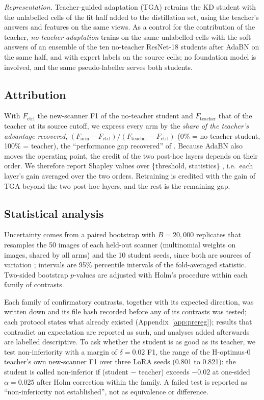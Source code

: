 \emph{Representation.} Teacher-guided adaptation (TGA) retrains the KD student with the unlabelled cells of the fit
half added to the distillation set, using the teacher's answers and features on the same views. As a control for the
contribution of the teacher, \emph{no-teacher adaptation} trains on the same
unlabelled cells with the soft answers of an ensemble of the ten no-teacher ResNet-18 students after AdaBN on the same
half, and with expert labels on the source cells; no foundation model is involved, and the same pseudo-labeller serves
both students.

\subsection{Attribution}

With $F_\text{ctrl}$ the new-scanner F1 of the no-teacher student and $F_\text{teacher}$ that of the teacher at its
source cutoff, we express every arm by the \emph{share of the teacher's advantage recovered},
$(F_\text{arm}-F_\text{ctrl})/(F_\text{teacher}-F_\text{ctrl})$ (0\% = no-teacher student, 100\% = teacher), the
``performance gap recovered'' of \citet{burns2023weak}. Because AdaBN also moves the operating point, the credit of the
two post-hoc layers depends on their order. We therefore report Shapley values over \{threshold, statistics\}
\citep{zhang2023why}, i.e.\ each layer's gain averaged over the two orders. Retraining is credited with the gain of TGA beyond the two post-hoc layers, and the rest is the remaining gap.

\subsection{Statistical analysis}
\label{sec:stats}

Uncertainty comes from a paired bootstrap \citep{efron1993introduction} with $B=20{,}000$ replicates that resamples the
50 images of each held-out scanner (multinomial weights on images, shared by all arms) and the 10 student seeds, since
both are sources of variation \citep{varoquaux2022machine}; intervals are 95\% percentile intervals of the
fold-averaged statistic. Two-sided bootstrap $p$-values are adjusted with Holm's procedure \citep{holm1979simple} within
each family of contrasts.

Each family of confirmatory contrasts, together with its expected direction, was written down and its file hash
recorded before any of its contrasts was tested; each protocol states what already existed (Appendix~\ref{app:prereg});
results that contradict an expectation are reported as such, and analyses added afterwards are labelled descriptive. To
ask whether the student is as good as its teacher, we test non-inferiority with a margin of $\delta=0.02$ F1, the range
of the H-optimus-0 teacher's own new-scanner F1 over three LoRA seeds (0.801 to 0.821): the student is called
non-inferior if (student $-$ teacher) exceeds $-0.02$ at one-sided $\alpha=0.025$ after Holm correction within the
family. A failed test is reported as ``non-inferiority not established'', not as equivalence or
difference.
